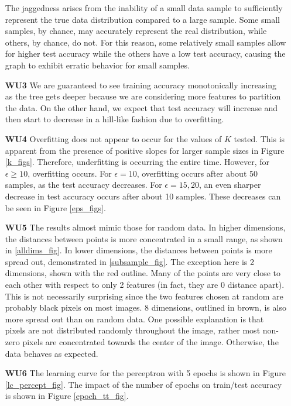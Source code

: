 \documentclass{article}
\begin{document}
\begin{enumerate}
		The jaggedness arises from the inability of a small data sample to sufficiently represent
		the true data distribution compared to a large sample. Some small samples, by chance, may
		accurately represent the real distribution, while others, by chance, do not. For this
		reason, some relatively small samples allow for higher test accuracy while the others
		have a low test accuracy, causing the graph to exhibit erratic behavior for small samples.
	
	\item[\textbf{WU3}] We are guaranteed to see training accuracy monotonically increasing as
		the tree gets deeper because we are considering more features to partition the data. On
		the other hand, we expect that test accuracy will increase and then start to decrease in
		a hill-like fashion due to overfitting. 
	
	\item[\textbf{WU4}] Overfitting does not appear to occur for the values of $K$ tested. This is
		apparent from the presence of positive slopes for larger sample sizes in Figure \ref{k_figs}.
		Therefore, underfitting is occurring the entire time. However, for $\epsilon \geq 10$,
		overfitting occurs. For $\epsilon = 10$, overfitting occurs after about 50 samples, as
		the test accuracy decreases. For $\epsilon = 15, 20$, an even sharper decrease in test
		accuracy occurs after about 10 samples. These decreases can be seen in Figure \ref{eps_figs}.
		
	\item[\textbf{WU5}] The results almost mimic those for random data. In higher dimensions, the
		distances between points is more concentrated in a small range, as shown in
		\ref{alldims_fig}. In lower dimensions, the distances between points is more spread out,
		demonstrated in \ref{subsample_fig}. The exception here is 2 dimensions, shown with the
		red outline. Many of the points are very close to each other with respect to only 2 features 
		(in fact, they are 0 distance apart). This is not necessarily surprising since the two features chosen
		at random are probably black pixels on most images. 8 dimensions, outlined in brown, 
		is also more spread out than on random data. One possible explanation is that pixels are 
		not distributed randomly throughout the image, rather most non-zero pixels are concentrated 
		towards the center of the image. Otherwise, the data behaves as expected.		
		
	\item[\textbf{WU6}] The learning curve for the perceptron with 5 epochs is shown in Figure
		 \ref{lc_percept_fig}. The impact of the number of epochs on train/test accuracy is shown
		 in Figure \ref{epoch_tt_fig}.
	
	\end{enumerate}
	
\end{document}
